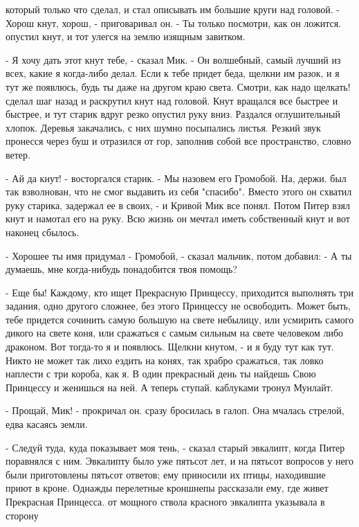 который только что сделал, и стал описывать им большие круги над 
головой. - Хорош кнут, хорош, - приговаривал он. - Ты только посмотри, 
как он ложится.
 опустил кнут, и тот улегся на землю изящным завитком.
\par- Я хочу дать этот кнут тебе, - сказал Мик. - Он волшебный, самый 
лучший из всех, какие я когда-либо делал. Если к тебе придет беда, 
щелкни им разок, и я тут же появлюсь, будь ты даже на другом краю 
света. Смотри, как надо щелкать!
 сделал шаг назад и раскрутил кнут над головой. Кнут вращался 
все быстрее и быстрее, и тут старик вдруг резко опустил руку вниз. 
Раздался оглушительный хлопок. Деревья закачались, с них шумно 
посыпались листья. Резкий звук пронесся через буш и отразился от гор, 
заполнив собой все пространство, словно ветер.
\par- Ай да кнут! - восторгался старик. - Мы назовем его Громобой. На, 
держи.
 был так взволнован, что не смог выдавить из себя "спасибо". 
Вместо этого он схватил руку старика, задержал ее в своих, - и Кривой 
Мик все понял. Потом Питер взял кнут и намотал его на руку. Всю жизнь 
он мечтал иметь собственный кнут и вот наконец сбылось.
\par- Хорошее ты имя придумал - Громобой, - сказал мальчик, потом 
добавил: - А ты думаешь, мне когда-нибудь понадобится твоя помощь?
\par- Еще бы! Каждому, кто ищет Прекрасную Принцессу, приходится 
выполнять три задания, одно другого сложнее, без этого Принцессу не 
освободить. Может быть, тебе придется сочинить самую большую на свете 
небылицу, или усмирить самого дикого на свете коня, или сражаться с 
самым сильным на свете человеком либо драконом. Вот тогда-то я и 
появлюсь. Щелкни кнутом, - и я буду тут как тут. Никто не может так 
лихо ездить на конях, так храбро сражаться, так ловко наплести с три 
короба, как я. В один прекрасный день ты найдешь Свою Принцессу и 
женишься на ней. А теперь ступай.
 каблуками тронул Мунлайт.
\par- Прощай, Мик! - прокричал он.
 сразу бросилась в галоп. Она мчалась стрелой, едва касаясь 
земли.
\par- Следуй туда, куда показывает моя тень, - сказал старый эвкалипт, 
когда Питер поравнялся с ним. Эвкалипту было уже пятьсот лет, и на 
пятьсот вопросов у него были приготовлены пятьсот ответов; ему 
приносили их птицы, находившие приют в кроне. Однажды перелетные 
кроншнепы рассказали ему, где живет Прекрасная Принцесса.
 от мощного ствола красного эвкалипта указывала в сторону 
